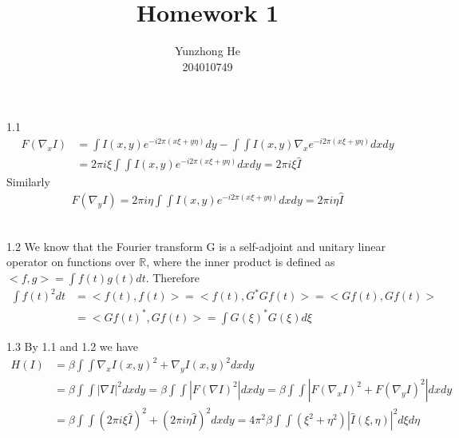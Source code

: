 \documentclass[12pt]{article}
\newenvironment{problem}[2][Problem]{\begin{trivlist}
\item[\hskip \labelsep {\bfseries #1}\hskip \labelsep {\bfseries #2}]}{\end{trivlist}}
\begin{document}
 
 
\title{Homework 1}%
\author{Yunzhong He\\ %
204010749} %
 
\maketitle

\begin{problem}{1.}
\item{1.1}
\begin{align*}
	F(\nabla_x I) &= \int I(x, y) e^{-i2\pi(x\xi + y\eta)}dy - \int\int I(x,y) \nabla_x e^{-i2\pi(x\xi + y\eta)} dxdy\\
	&= 2\pi i\xi\int\int I(x, y) e^{-i2\pi(x\xi+y\eta)} dxdy = 2\pi i \xi \hat{I}
\end{align*}
Similarly 
\begin{align*}
	F(\nabla_y I) = 2\pi i\eta\int\int I(x, y) e^{-i2\pi(x\xi+y\eta)} dxdy = 2\pi i \eta \hat{I}
\end{align*}\\
\item{1.2}
We know that the Fourier transform G is a self-adjoint and unitary linear operator on functions over $\mathbb{R}$, where the inner product is defined as $<f, g> = \int f(t)g(t) dt$. Therefore
\begin{align*}
	\int f(t)^2 dt &= <f(t), f(t)> = <f(t), G^*G f(t)> = <Gf(t), Gf(t)> \\
&= <Gf(t)^*, Gf(t)> = \int G(\xi)^*G(\xi) d\xi
\end{align*}

\item{1.3} By 1.1 and 1.2 we have
\begin{align*}
	H(I) &= \beta\int\int\nabla_xI(x,y)^2 + \nabla_yI(x,y)^2 dxdy \\
&= \beta\int\int |\nabla I|^2 dxdy = \beta\int\int |F(\nabla I)^2| dxdy = \beta\int\int |F(\nabla_x I)^2 + F(\nabla_y I)^2| dxdy\\
&= \beta\int\int (2\pi i \xi \hat{I})^2 + (2\pi i \eta \hat{I})^2 dxdy = 4\pi^2\beta\int\int(\xi^2 + \eta^2)|\hat{I}(\xi, \eta)|^2 d\xi d\eta
\end{align*}
\\


\end{problem}
\end{document}
